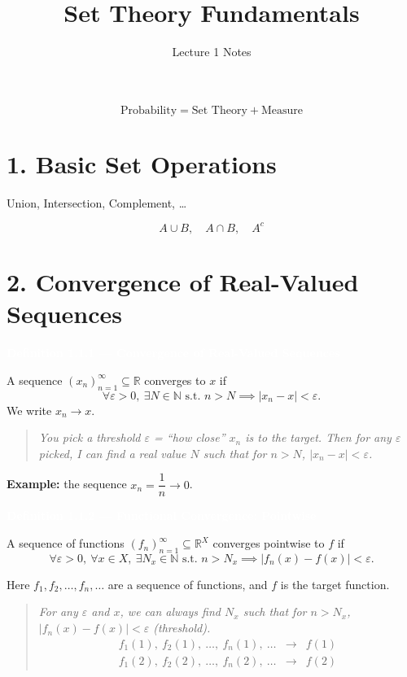 \documentclass[11pt]{article}
\title{\textbf{Set Theory Fundamentals}}
\author{Lecture 1 Notes}
\date{}
\newcommand{\deftitle}[1]{%
  \vspace{0.6em}
  \noindent\colorbox{defbg!70}{\parbox{\dimexpr\textwidth-2\fboxsep}{\textbf{\textcolor{white}{#1}}}}
  \vspace{0.4em}
}
\newenvironment{note}{\begin{quote}\color{noteblue}\itshape}{\end{quote}}
\begin{document}
\maketitle

\[
\text{Probability} = \text{Set Theory} + \text{Measure}
\]

\section*{1. Basic Set Operations}
Union, Intersection, Complement, \ldots

\[
A \cup B, \quad A \cap B, \quad A^c
\]

\section*{2. Convergence of Real-Valued Sequences}

\deftitle{Definition 1.1.1 --- Convergence of Real-Valued Sequences}

A sequence $(x_n)_{n=1}^{\infty} \subseteq \mathbb{R}$ converges to $x$ if
\[
\forall \varepsilon > 0,\ \exists N \in \mathbb{N} \text{ s.t. } n > N \implies |x_n - x| < \varepsilon.
\]
We write $x_n \to x$.

\begin{note}
You pick a threshold $\varepsilon$ = ``how close'' $x_n$ is to the target. Then for any $\varepsilon$ picked, I can find a real value $N$ such that for $n > N$, $|x_n - x| < \varepsilon$.
\end{note}

\noindent \textbf{Example:} the sequence $x_n = \dfrac{1}{n} \to 0$.

\deftitle{Definition 1.1.2 --- Functional Convergence: Pointwise}

A sequence of functions $(f_n)_{n=1}^{\infty} \subseteq \mathbb{R}^X$ converges pointwise to $f$ if
\[
\forall \varepsilon > 0,\ \forall x \in X,\ \exists N_x \in \mathbb{N} \text{ s.t. } n > N_x \implies |f_n(x) - f(x)| < \varepsilon.
\]

Here $f_1, f_2, \ldots, f_n, \ldots$ are a sequence of functions, and $f$ is the target function.

\begin{note}
For any $\varepsilon$ \emph{and} $x$, we can always find $N_x$ such that for $n > N_x$, $|f_n(x) - f(x)| < \varepsilon$ (threshold).
\[
\begin{array}{lclc}
f_1(1),\ f_2(1),\ \ldots,\ f_n(1),\ \ldots & \longrightarrow & f(1) \\
f_1(2),\ f_2(2),\ \ldots,\ f_n(2),\ \ldots & \longrightarrow & f(2)
\end{array}
\]
\end{note}
\end{document}
